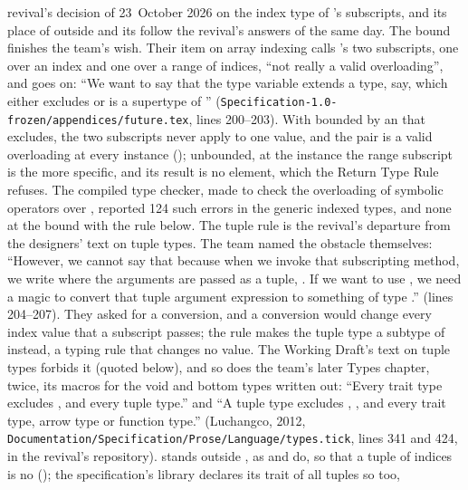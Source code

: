 \begin{description}
revival's decision of 23~October 2026 on the index type of \library's
subscripts, and its place of  outside  and its
 follow the revival's answers of the same day.
The bound finishes the team's wish.
Their item on array indexing calls 's two subscripts, one over an
index and one over a range of indices, ``not really a valid overloading'', and
goes on: ``We want to say that the type variable  extends a type, say,
 which either excludes  or is
a supertype of ''
(\nolinkurl{Specification-1.0-frozen/appendices/future.tex}, lines 200--203).
With  bounded by an  that  excludes, the two
subscripts never apply to one value, and the pair is a valid overloading at
every instance (); unbounded, at the instance
 the range subscript is the more specific, and its result is no
element, which the Return Type Rule refuses.
The compiled type checker, made to check the overloading of symbolic operators
over \library, reported 124 such errors in the generic indexed types, and none
at the bound with the rule below.
The tuple rule is the revival's departure from the designers' text on tuple
types.
The team named the obstacle themselves: ``However, we cannot say that because
when we invoke that subscripting method, we write  where the
arguments are passed as a tuple, . If we want to use
, we need a magic to convert that tuple argument expression to
something of type .'' (lines 204--207).
They asked for a conversion, and a conversion would change every index value
that a subscript passes; the rule makes the tuple type a subtype of
 instead, a typing rule that changes no value.
The Working Draft's text on tuple types forbids it (quoted below), and so does
the team's later Types chapter, twice, its macros for the void and bottom types
written out: ``Every trait type excludes \TYP{()},  and every
tuple type.'' and ``A tuple type excludes , \TYP{()}, and every
trait type, arrow type or function type.'' (Luchangco, 2012,
\nolinkurl{Documentation/Specification/Prose/Language/types.tick}, lines 341
and 424, in the revival's repository).
 stands outside , as  and  do, so
that a tuple of indices is no  (); the
specification's library declares its trait of all tuples so too,
\end{description}
